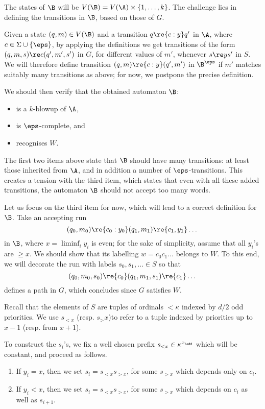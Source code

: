 The states of $\B$ will be $V(\B)=V(\A) \times \{1,\dots,k\}$.
The challenge lies in defining the transitions in $\B$, based on those of $G$.


Given a state $(q,m)\in V(\B)$ and a transition $q \re {c:y} q'$ in $\A$, where $c \in \Sigma \cup \{\eps\}$, by applying the definitions we get transitions of the form $(q,m,s) \re c (q',m',s')$ in $G$, for different values of $m'$, whenever $s \re y s'$ in $S$.
We will therefore define transition $(q,m) \re{c:y} (q',m')$ in $\B^\eps$ if $m'$ matches suitably many transitions as above; for now, we postpone the precise definition.

We should then verify that the obtained automaton $\B$:
\begin{itemize}
    \item is a $k$-blowup of $\A$,
    \item is $\eps$-complete, and
    \item recognises $W$.
\end{itemize}
The first two items above state that $\B$ should have many transitions: at least those inherited from $\A$, and in addition a number of $\eps$-transitions.
This creates a tension with the third item, which states that even with all these added transitions, the automaton $\B$ should not accept too many words.

Let us focus on the third item for now, which will lead to a correct definition for $\B$.
Take an accepting run
\[
    (q_0,m_0) \re{c_0:y_0} (q_1,m_1) \re{c_1,y_1} \dots
\]
in $\B$, where $x = \liminf_i y_i$ is even; for the sake of simplicity, assume that all $y_i$'s are $\geq x$.
We should show that its labelling $w=c_0c_1\dots$ belongs to $W$.
To this end, we will decorate the run with labels $s_0,s_1,\dots \in S$ so that
\[
    (q_0,m_0,s_0) \re{c_0} (q_1,m_1,s_1) \re{c_1} \dots
\]
defines a path in $G$, which concludes since $G$ satisfies $W$.

Recall that the elements of $S$ are tuples of ordinals $<\kappa$ indexed by $d/2$ odd priorities. We use $s_{<x}$ (resp. $s_>x$)to refer to a tuple indexed by priorities up to $x-1$ (resp. from $x+1$).

To construct the $s_i$'s, we fix a well chosen prefix $s_{<x}\in \kappa^{x_\odd}$ which will be constant, and proceed as follows.

\begin{enumerate}[(a.)]
    \item If $y_i=x$, then we set $s_i=s_{<x} s_{>x}$, for some $s_{>x}$ which depends only on $c_i$.
    \item If $y_i<x$, then we set $s_i=s_{<x} s_{>x}$, for some $s_{>x}$ which depends on $c_i$ as well as $s_{i+1}$.
\end{enumerate}


